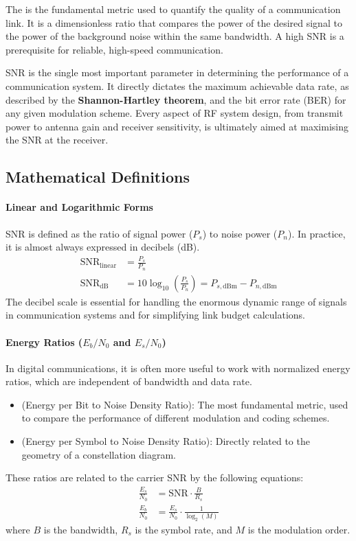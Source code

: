 The  is the fundamental metric used to quantify the quality of a communication link. It is a dimensionless ratio that compares the power of the desired signal to the power of the background noise within the same bandwidth. A high SNR is a prerequisite for reliable, high-speed communication.

\begin{keyconcept}
    SNR is the single most important parameter in determining the performance of a communication system. It directly dictates the maximum achievable data rate, as described by the \textbf{Shannon-Hartley theorem}, and the bit error rate (BER) for any given modulation scheme. Every aspect of RF system design, from transmit power to antenna gain and receiver sensitivity, is ultimately aimed at maximising the SNR at the receiver.
\end{keyconcept}


\subsection{Mathematical Definitions}

\paragraph{Linear and Logarithmic Forms}
SNR is defined as the ratio of signal power ($P_s$) to noise power ($P_n$). In practice, it is almost always expressed in decibels (dB).
\begin{align}
    \text{SNR}_{\text{linear}} &= \frac{P_s}{P_n} \\
    \text{SNR}_{\text{dB}} &= 10\log_{10}\left(\frac{P_s}{P_n}\right) = P_{s, \text{dBm}} - P_{n, \text{dBm}}
\end{align}
The decibel scale is essential for handling the enormous dynamic range of signals in communication systems and for simplifying link budget calculations.

\paragraph{Energy Ratios ($E_b/N_0$ and $E_s/N_0$)}
In digital communications, it is often more useful to work with normalized energy ratios, which are independent of bandwidth and data rate.
\begin{itemize}
    \item {} (Energy per Bit to Noise Density Ratio): The most fundamental metric, used to compare the performance of different modulation and coding schemes.
    \item {} (Energy per Symbol to Noise Density Ratio): Directly related to the geometry of a constellation diagram.
\end{itemize}
These ratios are related to the carrier SNR by the following equations:
\begin{align}
    \frac{E_s}{N_0} &= \text{SNR} \cdot \frac{B}{R_s} \\
    \frac{E_b}{N_0} &= \frac{E_s}{N_0} \cdot \frac{1}{\log_2(M)}
\end{align}
where $B$ is the bandwidth, $R_s$ is the symbol rate, and $M$ is the modulation order.

